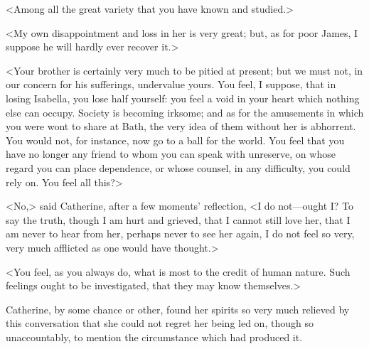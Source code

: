  <Among all the great variety that you have known and studied.> 

 <My own disappointment and loss in her is very great; but, as for poor James, I suppose he will hardly ever recover it.> 

 <Your brother is certainly very much to be pitied at present; but we must not, in our concern for his sufferings, undervalue yours. You feel, I suppose, that in losing Isabella, you lose half yourself: you feel a void in your heart which nothing else can occupy. Society is becoming irksome; and as for the amusements in which you were wont to share at Bath, the very idea of them without her is abhorrent. You would not, for instance, now go to a ball for the world. You feel that you have no longer any friend to whom you can speak with unreserve, on whose regard you can place dependence, or whose counsel, in any difficulty, you could rely on. You feel all this?> 

 <No,> said Catherine, after a few moments' reflection, <I do not—ought I? To say the truth, though I am hurt and grieved, that I cannot still love her, that I am never to hear from her, perhaps never to see her again, I do not feel so very, very much afflicted as one would have thought.> 

 <You feel, as you always do, what is most to the credit of human nature. Such feelings ought to be investigated, that they may know themselves.> 

 Catherine, by some chance or other, found her spirits so very much relieved by this conversation that she could not regret her being led on, though so unaccountably, to mention the circumstance which had produced it. 